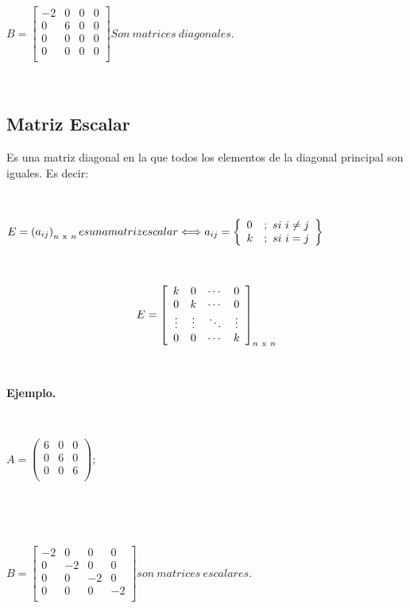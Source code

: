 \documentclass[11pt, conference]{IEEEtran}
\begin{document}
{\

\
    
$    
    B = \left[
    \begin{array}{cccc}
    	-2 & 0 & 0 & 0 \\
        0 & 6 & 0 & 0\\
        0 & 0 & 0 & 0 \\
        0 & 0 & 0 & 0 \\
    \end{array}
    \right]
    Son\ matrices\ diagonales.
$

\

\subsection{Matriz Escalar}
Es una matriz diagonal en la que todos los elementos de la diagonal principal son iguales. Es decir:

\

$
	E = \left(a_{ij}\right)_{n\ \textnormal{x}\ n} es una matriz escalar \Longleftrightarrow
    a_{ij} = 
    \left\{
    	\begin{array}{lc}
        	0 & ;\ si\ i \not = j \\
            k & ;\ si\ i = j \\
        \end{array}
    \right\}
$

\

\[
	E = \left[
  \begin{array}{cccc}
  k & 0 & \cdots & 0 \\
  0 & k & \cdots & 0 \\
  \vdots & \vdots &\ddots & \vdots \\
  0 & 0 & \cdots & k \\
  \end{array} \right]_{n\ \textnormal{x}\ n}
\]

\

\textbf{Ejemplo.}

\

$
	A = \left(
    \begin{array}{ccc}
    	6 & 0 & 0 \\
        0 & 6 & 0 \\
        0 & 0 & 6 \\
    \end{array}
    \right);\qquad
$

\

\

$
    B = \left[
    \begin{array}{cccc}
    	-2 & 0 & 0 & 0 \\
        0 & -2 & 0 & 0\\
        0 & 0 & -2 & 0 \\
        0 & 0 & 0 & -2 \\
    \end{array}
    \right]
    son\ matrices\ escalares.
$
\smallskip

}
\end{document}
